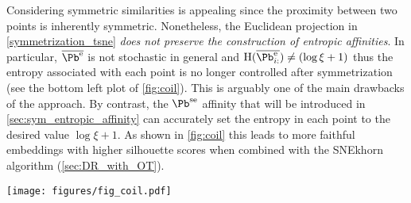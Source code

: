 \noindent\begin{minipage}{0.45\linewidth}
Considering symmetric similarities is appealing since the proximity between two
points is inherently symmetric. Nonetheless, the Euclidean projection in
\eqref{symmetrization_tsne} \emph{does not preserve the construction of entropic
affinities}.  In particular, $\overline{\Pb^{\mathrm{e}}}$ is not stochastic in
general and $\operatorname{H}(\overline{\Pb_{i:}^{\mathrm{e}}}) \neq (\log{\xi} + 1)$ thus the entropy associated with each point is no longer controlled after symmetrization (see the bottom left plot of \cref{fig:coil}). This is
arguably one of the main drawbacks of the approach. By contrast, the
$\Pb^{\mathrm{se}}$ affinity that will be introduced in \cref{sec:sym_entropic_affinity} can
accurately set the entropy in each point to the desired value $\log \xi + 1$.  As shown in \cref{fig:coil} this leads to more faithful embeddings with higher silhouette scores when combined with the SNEkhorn algorithm (\cref{sec:DR_with_OT}).
\end{minipage}
\hspace{0.01\linewidth}
\begin{minipage}{0.53\linewidth}
\centering
\texttt{[image: figures/fig\_coil.pdf]}
\end{minipage}

